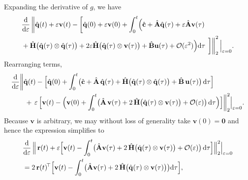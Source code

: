Expanding the derivative of $g$, we have\\
\begin{align*}
    &\dv{}{\varepsilon}
     \left\| \hat{\mathbf{q}}(t) + \varepsilon\mathbf{v}(t)
        - \left[
            \hat{\mathbf{q}}(0) + \varepsilon\mathbf{v}(0)
            + \int_0^t \Bigl(
                \hat{\mathbf{c}} 
                + \hat{\mathbf{A}}\hat{\mathbf{q}}(\tau)
                + \varepsilon\hat{\mathbf{A}}\mathbf{v}(\tau) \right. \right. \\
    &
                + \hat{\mathbf{H}}\big(\hat{\mathbf{q}}(\tau) \otimes \hat{\mathbf{q}}(\tau)\big)
                + 2\varepsilon\hat{\mathbf{H}}\big(\hat{\mathbf{q}}(\tau) \otimes \mathbf{v}(\tau)\big)
                + \hat{\mathbf{B}}\mathbf{u}(\tau)
                + \mathcal{O}(\varepsilon^2)
            \Bigr) \dd\tau
        \left. \left. \vphantom{\int_0^t} \right] \right\|_2^2 \Big|_{\varepsilon=0}.
\end{align*}
Rearranging terms,\\
\begin{align*}
&\frac{\mathrm d}{\mathrm d\varepsilon}
 \biggl\|
   \hat{\mathbf{q}}(t)
   - \Bigl[
       \hat{\mathbf{q}}(0)
       + \int_{0}^{t}
           \bigl(
             \hat{\mathbf{c}}
             + \hat{\mathbf{A}}\,\hat{\mathbf{q}}(\tau)
             + \hat{\mathbf{H}}\bigl(\hat{\mathbf{q}}(\tau)\otimes\hat{\mathbf{q}}(\tau)\bigr)
             + \hat{\mathbf{B}}\,\mathbf{u}(\tau)
           \bigr)
         \,\mathrm d\tau
     \Bigr] \\
&\quad\quad
 + \,\varepsilon\,
   \Bigl[
     \mathbf{v}(t)
     - \Bigl(
         \mathbf{v}(0)
         + \int_{0}^{t}
             \bigl(
               \hat{\mathbf{A}}\,\mathbf{v}(\tau)
               + 2\,\hat{\mathbf{H}}\bigl(\hat{\mathbf{q}}(\tau)\otimes\mathbf{v}(\tau)\bigr)
               + \mathcal{O}(\varepsilon)
             \bigr)
           \,\mathrm d\tau
       \Bigr)
   \Bigr]
 \biggr\|_{2}^{2}
 \Big|_{\varepsilon=0}.
\end{align*}
Because $\mathbf{v}$ is arbitrary, we may without loss of generality take $\mathbf{v}(0)=\bm{0}$ and hence the expression simplifies to\\ 
\begin{align*}
&\frac{\mathrm{d}}{\mathrm{d}\varepsilon}\,\Big\|\,\mathbf{r}(t)+ \varepsilon\Bigl[\mathbf{v}(t)- \int_{0}^{t}\bigl(\hat{\mathbf{A}}\mathbf{v}(\tau)+2\,\hat{\mathbf{H}}\bigl(\hat{\mathbf{q}}(\tau)\otimes\mathbf{v}(\tau)\bigr)+ \mathcal{O}(\varepsilon)\big)\,\mathrm{d}\tau\Bigr]\Big\|_{2}^{2}\Big|_{\varepsilon=0}\\
&=2\,\mathbf{r}(t)^{\!\top}\Bigl[\mathbf{v}(t)- \int_{0}^{t}\bigl(\hat{\mathbf{A}}\mathbf{v}(\tau)+2\,\hat{\mathbf{H}}\bigl(\hat{\mathbf{q}}(\tau)\otimes\mathbf{v}(\tau)\bigr)\bigr)\mathrm{d}\tau\Bigr],
\label{eq:Dg_directional}
\end{align*}
